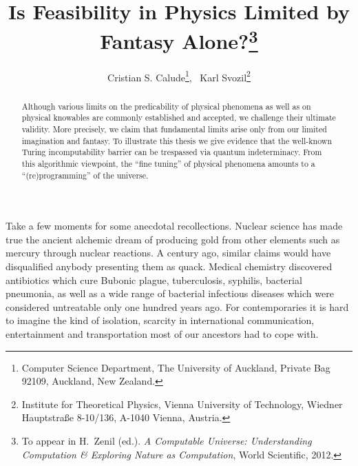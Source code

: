 \documentclass[12pt]{article}
\begin{document}


\title{Is Feasibility in Physics Limited by Fantasy Alone?\thanks{To appear in H.~Zenil (ed.). {\em A Computable Universe: Understanding Computation \& Exploring Nature as Computation},
 World Scientific,
 2012.}}




\author{Cristian S.  Calude\thanks{Computer Science Department,
The University of Auckland,
 Private Bag 92109,
 Auckland,
 New Zealand.},  \,
 Karl Svozil\thanks{Institute for Theoretical Physics, Vienna University of Technology,
Wiedner Hauptstra\ss e 8-10/136, A-1040 Vienna, Austria.}}


\maketitle

\begin{abstract}
Although various limits on the predicability of physical phenomena as well as on physical knowables are commonly established and accepted, we challenge their ultimate validity. More precisely, we claim that fundamental limits arise only from our limited imagination and fantasy. To illustrate this thesis we
give evidence that the well-known Turing incomputability barrier can be trespassed via quantum indeterminacy.
From this algorithmic viewpoint, the  ``fine tuning'' of physical phenomena amounts to a ``(re)programming'' of the universe.\end{abstract}




Take a few moments for some anecdotal recollections.
Nuclear science has made true the ancient alchemic dream of producing
gold from other elements such as mercury through nuclear reactions.
A century ago, similar claims would have disqualified anybody presenting them as quack.
Medical chemistry discovered antibiotics which cure Bubonic plague, tuberculosis, syphilis, bacterial pneumonia,
as well as a wide range of bacterial infectious diseases
which were considered untreatable only one hundred years ago.
For  contemporaries it is hard to imagine the kind of isolation, scarcity in international communication,
entertainment and transportation most of our ancestors had to cope with.
\end{document}
